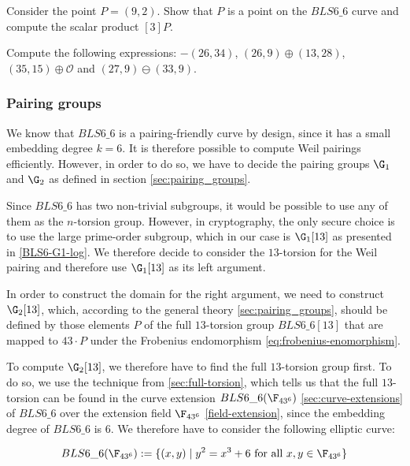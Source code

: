 \endgroup
\begin{exercise}
\label{ex:BLS66-scalar-product}
Consider the point $P=(9,2)$. Show that $P$ is a point on the $BLS6\_6$ curve and compute the scalar product $[3]P$. 
\end{exercise}
\begin{exercise}
Compute the following expressions: $-(26,34)$, $(26,9)\oplus(13,28)$, $(35,15)\oplus \mathcal{O}$ and $(27,9)\ominus(33,9)$.
\end{exercise}
\subsubsection{Pairing groups}
\label{sec:bls66-pairing-groups}
We know that $BLS6\_6$ is a pairing-friendly curve by design, since it has a small embedding degree $k=6$. It is therefore possible to compute Weil pairings efficiently. However, in order to do so, we have to decide the pairing groups $\G_1$ and $\G_2$ as defined in section \ref{sec:pairing_groups}. 

Since $BLS6\_6$ has two non-trivial subgroups, it would be possible to use any of them as the $n$-torsion group. However, in cryptography, the only secure choice is to use the large prime-order subgroup, which in our case is $\G_1[13]$ as presented in \ref{BLS6-G1-log}. We therefore decide to consider the $13$-torsion for the Weil pairing and therefore use $\G_1[13]$ as its left argument.

In order to construct the domain for the right argument, we need to construct $\G_2[13]$, which, according to the general theory \ref{sec:pairing_groups}, should be defined by those elements $P$ of the full $13$-torsion group  $BLS6\_6[13]$ that are mapped to $43\cdot P$ under the Frobenius endomorphism \ref{eq:frobenius-enomorphism}. 

To compute $\G_2[13]$, we therefore have to find the full $13$-torsion group first. To do so, we use the technique from \ref{sec:full-torsion}, which tells us that the full $13$-torsion can be found in the curve extension $BLS6\_6(\F_{43^6})$ \ref{sec:curve-extensions} of $BLS6\_6$ over the extension field $\F_{43^6}$ \ref{field-extension}, since the embedding degree of $BLS6\_6$ is $6$. We therefore have to consider the following elliptic curve:

\begin{equation}
\label{def:extended-bls6}
BLS6\_6(\F_{43^6}) := \{(x,y)\;|\; y^2 = x^3 + 6 \text{ for all } x,y \in \F_{43^6}\}
\end{equation}

